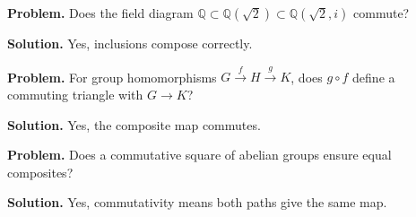 \begin{example}\label{ex:sec14-8}
\textbf{Problem.} Does the field diagram $\mathbb{Q}\subset\mathbb{Q}(\sqrt{2})\subset\mathbb{Q}(\sqrt{2},i)$ commute?

\textbf{Solution.} Yes, inclusions compose correctly.
\end{example}

\begin{example}\label{ex:sec14-9}
\textbf{Problem.} For group homomorphisms $G\xrightarrow{f}H\xrightarrow{g}K$, does $g\circ f$ define a commuting triangle with $G\to K$?

\textbf{Solution.} Yes, the composite map commutes.
\end{example}

\begin{example}\label{ex:sec14-10}
\textbf{Problem.} Does a commutative square of abelian groups ensure equal composites?

\textbf{Solution.} Yes, commutativity means both paths give the same map.
\end{example}

